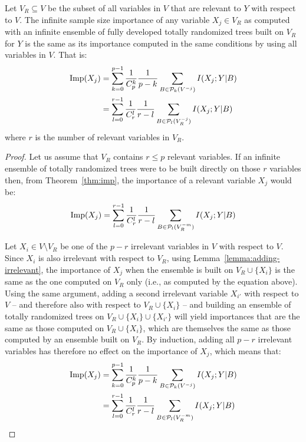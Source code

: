 \begin{theorem}\label{thm:relevant}
  Let $V_R \subseteq V$ be the subset of all variables in $V$ that are relevant to $Y$ with
  respect to $V$. The infinite sample size importance of any variable $X_j \in
  V_R$ as computed with an infinite ensemble of fully developed totally randomized
  trees built on $V_R$ for $Y$ is the same as its importance computed in the same conditions by using all variables in $V$. That is:
    \begin{align}
      \text{Imp}(X_j)&=\sum_{k=0}^{p-1} \frac{1}{C_p^k} \frac{1}{p-k} \sum_{B \in {\cal P}_k(V^{-j})} I(X_j;Y|B)\nonumber \\
                     &=\sum_{l=0}^{r-1} \frac{1}{C_r^l} \frac{1}{r-l} \sum_{B \in {\cal P}_l(V_R^{-j})} I(X_j;Y|B)
    \end{align}
  where $r$ is the number of relevant variables in $V_R$.
\end{theorem}

\begin{proof}
Let us assume that $V_R$ contains $r \leq p$ relevant variables. If an infinite
ensemble of totally randomized trees were to be built directly on those $r$
variables then, from Theorem~\ref{thm:imp}, the importance of a relevant
variable $X_j$ would be:
\begin{equation}%
  \text{Imp}(X_j)=\sum_{l=0}^{r-1} \frac{1}{C_r^l} \frac{1}{r-l} \sum_{B \in {\cal P}_l(V_R^{-m})} I(X_j;Y|B)
\end{equation}

Let $X_i \in V \setminus V_R$ be one of the $p-r$ irrelevant variables in $V$
with respect to $V$. Since $X_i$ is also irrelevant with respect to $V_R$, using
Lemma~\ref{lemma:adding-irrelevant}, the importance of $X_j$ when the ensemble
is built on $V_R \cup \{X_i\}$ is the same as the one computed on $V_R$ only
(i.e., as computed by the equation above). Using the same argument,
adding a second irrelevant variable $X_{i'}$ with respect to $V$ -- and therefore
also with respect to $V_R \cup \{X_i\}$ -- and building an ensemble of totally
randomized trees on $V_R \cup \{X_i\} \cup \{X_{i'}\}$ will yield importances
that are the same as those computed on $V_R \cup \{X_i\}$, which are themselves
the same as those computed by an ensemble built on $V_R$. By induction, adding
all $p-r$ irrelevant variables has therefore no effect on the importance of
$X_j$, which means that:
\begin{align}%
  \text{Imp}(X_j)&=\sum_{k=0}^{p-1} \frac{1}{C_p^k} \frac{1}{p-k} \sum_{B \in {\cal P}_k(V^{-j})} I(X_j;Y|B)\nonumber \\
          &=\sum_{l=0}^{r-1} \frac{1}{C_r^l} \frac{1}{r-l} \sum_{B \in {\cal P}_l(V_R^{-m})} I(X_j;Y|B)
\end{align}
\end{proof}

